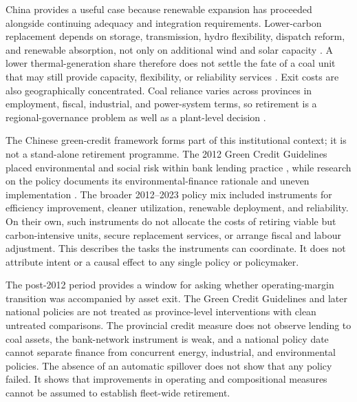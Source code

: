 \documentclass[11pt]{article}
\begin{document}
China provides a useful case because renewable expansion has proceeded alongside continuing adequacy and integration requirements. Lower-carbon replacement depends on storage, transmission, hydro flexibility, dispatch reform, and renewable absorption, not only on additional wind and solar capacity \parencite{he2016,he2020,liu2019,davidson2016}. A lower thermal-generation share therefore does not settle the fate of a coal unit that may still provide capacity, flexibility, or reliability services \parencite{yin2021,an2025}. Exit costs are also geographically concentrated. Coal reliance varies across provinces in employment, fiscal, industrial, and power-system terms, so retirement is a regional-governance problem as well as a plant-level decision \parencite{jiang2023,greengambhir2020,hansencoenen2015}.

The Chinese green-credit framework forms part of this institutional context; it is not a stand-alone retirement programme. The 2012 Green Credit Guidelines placed environmental and social risk within bank lending practice \parencite{cbrc2012}, while research on the policy documents its environmental-finance rationale and uneven implementation \parencite{aizawayang2010,zhangyangbi2011}. The broader 2012--2023 policy mix included instruments for efficiency improvement, cleaner utilization, renewable deployment, and reliability. On their own, such instruments do not allocate the costs of retiring viable but carbon-intensive units, secure replacement services, or arrange fiscal and labour adjustment. This describes the tasks the instruments can coordinate. It does not attribute intent or a causal effect to any single policy or policymaker.

The post-2012 period provides a window for asking whether operating-margin transition was accompanied by asset exit. The Green Credit Guidelines and later national policies are not treated as province-level interventions with clean untreated comparisons. The provincial credit measure does not observe lending to coal assets, the bank-network instrument is weak, and a national policy date cannot separate finance from concurrent energy, industrial, and environmental policies. The absence of an automatic spillover does not show that any policy failed. It shows that improvements in operating and compositional measures cannot be assumed to establish fleet-wide retirement.
\end{document}
